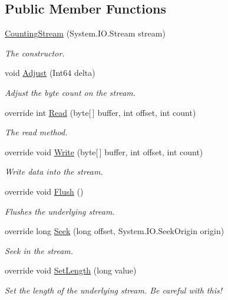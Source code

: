 \subsection*{Public Member Functions}
\begin{DoxyCompactItemize}
\item 
\mbox{\hyperlink{class_super_tiled2_unity_1_1_ionic_1_1_zip_1_1_counting_stream_a3e2728e7a4ebd80bd540152e6a0c278d}{Counting\+Stream}} (System.\+I\+O.\+Stream stream)
\begin{DoxyCompactList}\small\item\em The constructor. \end{DoxyCompactList}\item 
void \mbox{\hyperlink{class_super_tiled2_unity_1_1_ionic_1_1_zip_1_1_counting_stream_a62255a1e70ebcde67b88d4631d773c0d}{Adjust}} (Int64 delta)
\begin{DoxyCompactList}\small\item\em Adjust the byte count on the stream. \end{DoxyCompactList}\item 
override int \mbox{\hyperlink{class_super_tiled2_unity_1_1_ionic_1_1_zip_1_1_counting_stream_a54ad33f7f179c692c3b4dafc3f60ae06}{Read}} (byte\mbox{[}$\,$\mbox{]} buffer, int offset, int count)
\begin{DoxyCompactList}\small\item\em The read method. \end{DoxyCompactList}\item 
override void \mbox{\hyperlink{class_super_tiled2_unity_1_1_ionic_1_1_zip_1_1_counting_stream_a470131ef45d0fe5dd5494ad87ef0f78c}{Write}} (byte\mbox{[}$\,$\mbox{]} buffer, int offset, int count)
\begin{DoxyCompactList}\small\item\em Write data into the stream. \end{DoxyCompactList}\item 
override void \mbox{\hyperlink{class_super_tiled2_unity_1_1_ionic_1_1_zip_1_1_counting_stream_a08a709573aafe7a7154dc72e68b11a65}{Flush}} ()
\begin{DoxyCompactList}\small\item\em Flushes the underlying stream. \end{DoxyCompactList}\item 
override long \mbox{\hyperlink{class_super_tiled2_unity_1_1_ionic_1_1_zip_1_1_counting_stream_ad8cd38d7937983f8ba8859268fd17391}{Seek}} (long offset, System.\+I\+O.\+Seek\+Origin origin)
\begin{DoxyCompactList}\small\item\em Seek in the stream. \end{DoxyCompactList}\item 
override void \mbox{\hyperlink{class_super_tiled2_unity_1_1_ionic_1_1_zip_1_1_counting_stream_a66783972f223ec609b18625aeb9615c9}{Set\+Length}} (long value)
\begin{DoxyCompactList}\small\item\em Set the length of the underlying stream. Be careful with this! \end{DoxyCompactList}\end{DoxyCompactItemize}

